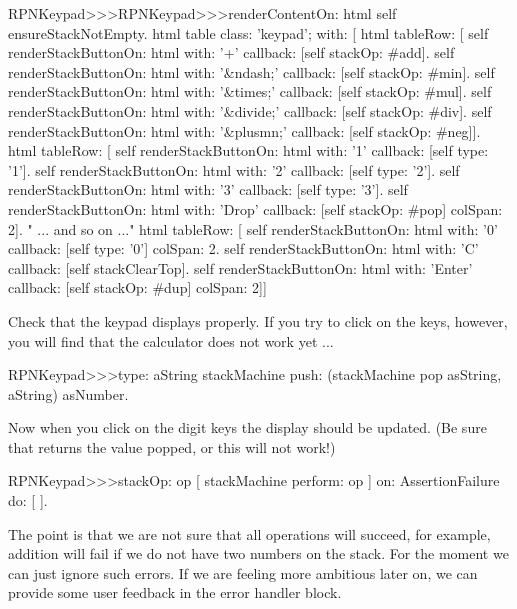 \documentclass[a4paper,10pt,twoside]{book}
\begin{document}
\begin{code}{}
RPNKeypad>>>RPNKeypad>>>renderContentOn: html 
  self ensureStackNotEmpty.
  html table
    class: 'keypad';
    with: [
      html tableRow: [
        self renderStackButtonOn: html with: '+' callback: [self stackOp: #add].
        self renderStackButtonOn: html with: '&ndash;' callback: [self stackOp: #min].
        self renderStackButtonOn: html with: '&times;' callback: [self stackOp: #mul].
        self renderStackButtonOn: html with: '&divide;' callback: [self stackOp: #div].
        self renderStackButtonOn: html with: '&plusmn;' callback: [self stackOp: #neg]].
      html tableRow: [
        self renderStackButtonOn: html with: '1' callback: [self type: '1'].
        self renderStackButtonOn: html with: '2' callback: [self type: '2'].
        self renderStackButtonOn: html with: '3' callback: [self type: '3'].
        self renderStackButtonOn: html with: 'Drop' callback: [self stackOp: #pop]
              colSpan: 2].
" ... and so on ..."
      html tableRow: [
        self renderStackButtonOn: html with: '0' callback: [self type: '0']
              colSpan: 2.
        self renderStackButtonOn: html with: 'C' callback: [self stackClearTop].
        self renderStackButtonOn: html with: 'Enter' callback: [self stackOp: #dup]
              colSpan: 2]]

\end{code}

Check that the keypad displays properly.
If you try to click on the keys, however, you will find that the calculator does not work yet ...

\begin{code}{}
RPNKeypad>>>type: aString
	stackMachine push: (stackMachine pop asString, aString) asNumber.
\end{code}
Now when you click on the digit keys the display should be updated.
(Be sure that  returns the value popped, or this will not work!)



\begin{code}{}
RPNKeypad>>>stackOp: op
	[ stackMachine perform: op ] on: AssertionFailure do: [ ].
\end{code}

The point is that we are not sure that all operations will succeed, for example, addition will fail if we do not have two numbers on the stack.
For the moment we can just ignore such errors.
If we are feeling more ambitious later on, we can provide some user feedback in the error handler block.
\end{document}
